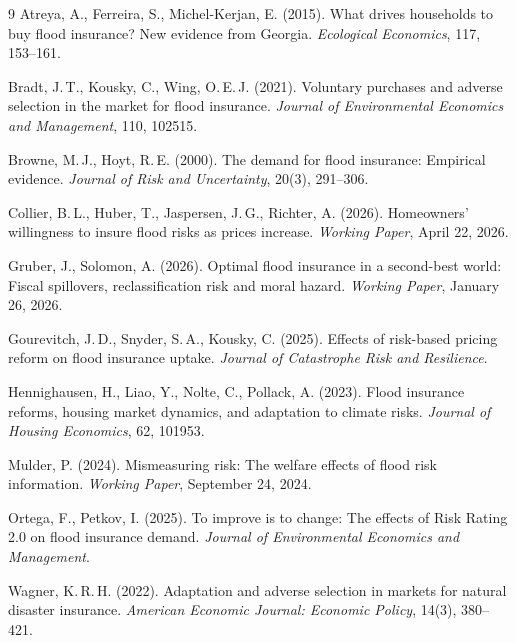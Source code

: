 \documentclass[11pt]{article}
\begin{document}

\begin{thebibliography}{9}
Atreya, A., Ferreira, S., Michel-Kerjan, E. (2015).
What drives households to buy flood insurance? New evidence from Georgia.
\textit{Ecological Economics}, 117, 153--161.

Bradt, J.\,T., Kousky, C., Wing, O.\,E.\,J. (2021).
Voluntary purchases and adverse selection in the market for flood insurance.
\textit{Journal of Environmental Economics and Management}, 110, 102515.

Browne, M.\,J., Hoyt, R.\,E. (2000).
The demand for flood insurance: Empirical evidence.
\textit{Journal of Risk and Uncertainty}, 20(3), 291--306.

Collier, B.\,L., Huber, T., Jaspersen, J.\,G., Richter, A. (2026).
Homeowners' willingness to insure flood risks as prices increase.
\textit{Working Paper}, April 22, 2026.

Gruber, J., Solomon, A. (2026).
Optimal flood insurance in a second-best world: Fiscal spillovers, reclassification risk and moral hazard.
\textit{Working Paper}, January 26, 2026.

Gourevitch, J.\,D., Snyder, S.\,A., Kousky, C. (2025).
Effects of risk-based pricing reform on flood insurance uptake.
\textit{Journal of Catastrophe Risk and Resilience}.

Hennighausen, H., Liao, Y., Nolte, C., Pollack, A. (2023).
Flood insurance reforms, housing market dynamics, and adaptation to climate risks.
\textit{Journal of Housing Economics}, 62, 101953.

Mulder, P. (2024).
Mismeasuring risk: The welfare effects of flood risk information.
\textit{Working Paper}, September 24, 2024.

Ortega, F., Petkov, I. (2025).
To improve is to change: The effects of Risk Rating 2.0 on flood insurance demand.
\textit{Journal of Environmental Economics and Management}.

Wagner, K.\,R.\,H. (2022).
Adaptation and adverse selection in markets for natural disaster insurance.
\textit{American Economic Journal: Economic Policy}, 14(3), 380--421.
\end{thebibliography}
\end{document}
